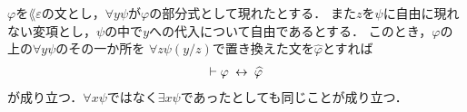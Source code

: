 	\begin{screen}
		\begin{logicalthm}[束縛された変項を取り替えても同値]
		\label{logicalthm:equivalence_by_replacing_bound_variables}
			$\varphi$を$\lang{\varepsilon}$の文とし，$\forall y \psi$が$\varphi$の部分式として現れたとする．
			また$z$を$\psi$に自由に現れない変項とし，$\psi$の中で$y$への代入について自由であるとする．
			このとき，$\varphi$の上の$\forall y \psi$のその一か所を
			$\forall z \psi(y/z)$で置き換えた文を$\widehat{\varphi}$とすれば
			\begin{align}
				\vdash \varphi \hspace{0.25em}\leftrightarrow\hspace{0.25em} \widehat{\varphi}
			\end{align}
			が成り立つ．$\forall x \psi$ではなく$\exists x \psi$であったとしても同じことが成り立つ．
		\end{logicalthm}
	\end{screen}
	
